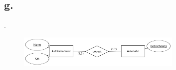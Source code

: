 \documentclass{article}
\begin{document}
		
		
		
		\pagebreak
		
		\subsection*{g.}
		.
			\begin{figure}[h]
				\includegraphics[width=0.7\textwidth]{aufgabe_1_2_g.png}
			\end{figure}
		
		
		
\end{document}
